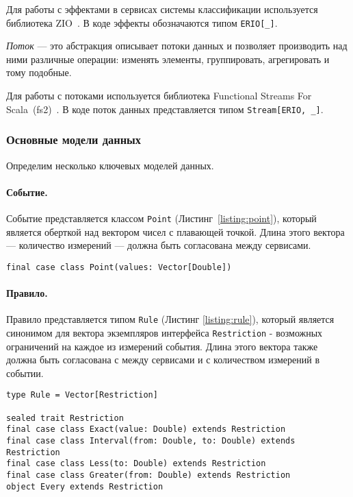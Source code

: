 \documentclass[14pt]{article}
\begin{document}
Для работы с эффектами в сервисах системы классификации используется библиотека ZIO~\cite{zio}. В коде эффекты обозначаются типом \verb|ERIO[_]|.

\emph{Поток} --- это абстракция описывает потоки данных и позволяет производить над ними различные операции: изменять элементы, группировать, агрегировать и тому подобные.

Для работы с потоками используется библиотека Functional Streams For Scala~(fs2)~\cite{fs2}. В коде поток данных представляется типом \verb|Stream[ERIO, _]|.

\subsubsection{Основные модели данных}
Определим несколько ключевых моделей данных.
\paragraph{Событие.} Событие представляется классом \verb|Point| (Листинг~\ref{listing:point}), который является оберткой над вектором чисел с плавающей точкой. Длина этого вектора --- количество измерений --- должна быть согласована между сервисами.

\begin{lstlisting}[style=scalaStyle,caption={Класс, описывающий событие},label={listing:point},captionpos=b, float]
final case class Point(values: Vector[Double])
\end{lstlisting}

\paragraph{Правило.}
Правило представляется типом \verb|Rule| (Листинг \ref{listing:rule}), который является синонимом для вектора экземпляров интерфейса \verb|Restriction| - возможных ограничений на каждое из измерений события. Длина этого вектора также должна быть согласована с между сервисами и с количеством измерений в событии.

\begin{lstlisting}[style=scalaStyle,caption={Тип, описывающий правило},label={listing:rule},captionpos=b, float]
type Rule = Vector[Restriction]

sealed trait Restriction
final case class Exact(value: Double) extends Restriction
final case class Interval(from: Double, to: Double) extends Restriction
final case class Less(to: Double) extends Restriction
final case class Greater(from: Double) extends Restriction
object Every extends Restriction
\end{lstlisting}
\end{document}
